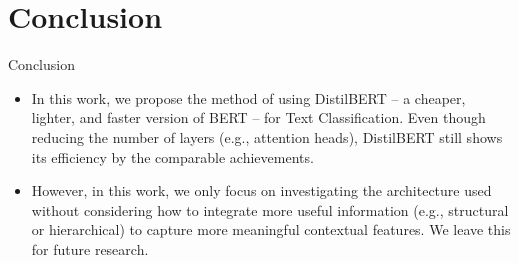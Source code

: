 \section{Conclusion}
\begin{frame}{Conclusion} 
\begin{itemize}
\item In this work, we propose the method of using DistilBERT -- a cheaper, lighter, and faster version of BERT -- for Text Classification. Even though reducing the number of layers (e.g., attention heads), DistilBERT still shows its efficiency by the comparable achievements.
\item However, in this work, we only focus on investigating the architecture used without considering how to integrate more useful information (e.g., structural or hierarchical) to capture more meaningful contextual features. We leave this for future research.
\end{itemize}
\end{frame}